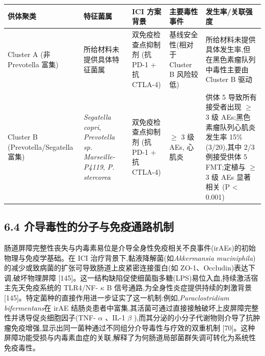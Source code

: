 {\def\LTcaptype{none} %
\begin{longtable}[]{@{}
  >{\raggedright\arraybackslash}p{}
  >{\raggedright\arraybackslash}p{}
  >{\raggedright\arraybackslash}p{}
  >{\raggedright\arraybackslash}p{}
  >{\raggedright\arraybackslash}p{}@{}}
\toprule\noalign{}
\begin{minipage}[b]{\linewidth}\raggedright
供体聚类
\end{minipage} & \begin{minipage}[b]{\linewidth}\raggedright
特征菌属
\end{minipage} & \begin{minipage}[b]{\linewidth}\raggedright
ICI 方案背景
\end{minipage} & \begin{minipage}[b]{\linewidth}\raggedright
主要毒性事件
\end{minipage} & \begin{minipage}[b]{\linewidth}\raggedright
发生率/关联强度
\end{minipage} \\
\midrule\noalign{}
\endhead
\bottomrule\noalign{}
\endlastfoot
Cluster A (非 Prevotella 富集) & 所给材料未提供具体特征菌属 & 双免疫检查点抑制剂 (抗 PD-1 + 抗 CTLA-4) & 基线安全性(相对于 Cluster B 风险较低) & 所给材料未提供具体发生率,但在黑色素瘤队列中毒性主要由 Cluster B 驱动 \\
Cluster B (Prevotella/Segatella 富集) & \emph{Segatella copri}, \emph{Prevotella sp. Marseille-P4119}, \emph{P. stercorea} & 双免疫检查点抑制剂 (抗 PD-1 + 抗 CTLA-4) & \(\geq\) 3 级 AEs, 心肌炎 & 供体 5 导致所有接受者出现 \(\geq\) 3 级 AEs;黑色素瘤队列心肌炎发生率 15\% (3/20),其中 2/3 例接受供体 5 FMT;定植与 \(\geq\) 3 级 AEs 显著相关 (P \textless{} 0.001) \\
\end{longtable}
}

\subsection{6.4 介导毒性的分子与免疫通路机制}\label{ux4ecbux5bfcux6bd2ux6027ux7684ux5206ux5b50ux4e0eux514dux75abux901aux8defux673aux5236}

肠道屏障完整性丧失与内毒素易位是介导全身性免疫相关不良事件(irAEs)的初始物理与免疫学基础。在 ICI 治疗背景下,黏液降解菌(如\emph{Akkermansia muciniphila})的减少或致病菌的扩张可导致肠道上皮紧密连接蛋白(如 ZO-1、Occludin)表达下调,破坏物理屏障 {[}145{]}。这一结构缺陷促使细菌脂多糖(LPS)易位入血,持续激活宿主先天免疫系统的 TLR4/NF- \(\kappa\) B 信号通路,为全身性炎症提供持续的刺激背景 {[}145{]}。特定菌种的直接作用进一步证实了这一机制:例如,\emph{Paraclostridium bifermentans}在 irAE 结肠炎患者中富集,其活菌可通过直接接触破坏上皮屏障完整性并诱导促炎细胞因子(TNF- \(\alpha\) 、IL-1 \(\beta\) ),而其分泌的小分子代谢物则介导了抗肿瘤免疫增强,显示出同一菌种通过不同组分介导毒性与疗效的双重机制 {[}70{]}。这种屏障功能受损与内毒素血症的关联,解释了为何肠道局部菌群失调可转化为系统性免疫毒性。

